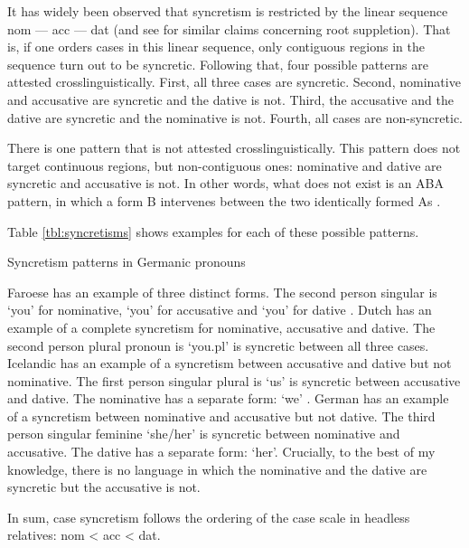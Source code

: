 It has widely been observed that syncretism is restricted by the linear sequence \ac{nom} --- \ac{acc} --- \ac{dat} \citep{baerman2005,caha2009,zompi2017} (and see \citealt{mcfadden2018,smith2019} for similar claims concerning root suppletion). That is, if one orders cases in this linear sequence, only contiguous regions in the sequence turn out to be syncretic.
Following that, four possible patterns are attested crosslinguistically. First, all three cases are syncretic. Second, nominative and accusative are syncretic and the dative is not. Third, the accusative and the dative are syncretic and the nominative is not. Fourth, all cases are non-syncretic.

There is one pattern that is not attested crosslinguistically. This pattern does not target continuous regions, but non-contiguous ones: nominative and dative are syncretic and accusative is not. In other words, what does not exist is an ABA pattern, in which a form B intervenes between the two identically formed As \citep{bobaljik2012}.

Table \ref{tbl:syncretisms} shows examples for each of these possible patterns.

\begin{table}[H]
  \center
  \caption {Syncretism patterns in Germanic pronouns}
    
  \label{tbl:syncretisms}
\end{table}

Faroese has an example of three distinct forms. The second person singular is  `you' for nominative,  `you' for accusative and  `you' for dative .
Dutch has an example of a complete syncretism for nominative, accusative and dative. The second person plural pronoun is  `you.\ac{pl}' is syncretic between all three cases.
Icelandic has an example of a syncretism between accusative and dative but not nominative. The first person singular plural is  `us' is syncretic between accusative and dative. The nominative has a separate form:  `we' .
German has an example of a syncretism between nominative and accusative but not dative. The third person singular feminine  `she/her' is syncretic between nominative and accusative. The dative has a separate form:  `her'.
Crucially, to the best of my knowledge, there is no language in which the nominative and the dative are syncretic but the accusative is not.

In sum, case syncretism follows the ordering of the case scale in headless relatives: \ac{nom} < \ac{acc} < \ac{dat}.


